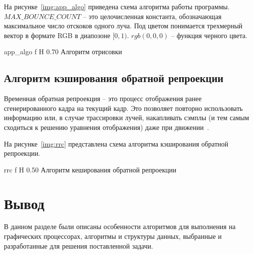 На рисунке~\ref{img:app_algo} приведена схема алгоритма работы программы.
$MAX\_BOUNCE\_COUNT$ -- это целочисленная константа, обозначающая максимальное число
отскоков одного луча. Под цветом понимается
трехмерный вектор в формате RGB в диапозоне $[0, 1)$. $rgb(0,0,0)$ -- функция черного цвета. 

    {app_algo}
    {f}
    {H}
    {0.70\textwidth}
    {Алгоритм отрисовки}

\subsection{Алгоритм кэширования обратной репроекции}

Временная обратная репроекция -- это процесс отображения ранее сгенерированного кадра на 
текущий кадр. Это позволяет повторно использовать информацию или, в случае трассировки 
лучей, накапливать сэмплы (и тем самым сходиться к решению уравнения отображения) даже при движении~\cite{ARTSwRPC}.

На рисунке~\ref{img:rrc} представлена схема алгоритма кэширования обратной
репроекции.

    {rrc}
    {f}
    {H}
    {0.50\textwidth}
    {Алгоритм кеширования обратной репроекции}

\section*{Вывод}

В данном разделе были описаны особенности алгоритмов для выполнения
на графических процессорах, алгоритмы и структуры данных, выбранные 
и разработанные для решения поставленной задачи. 
